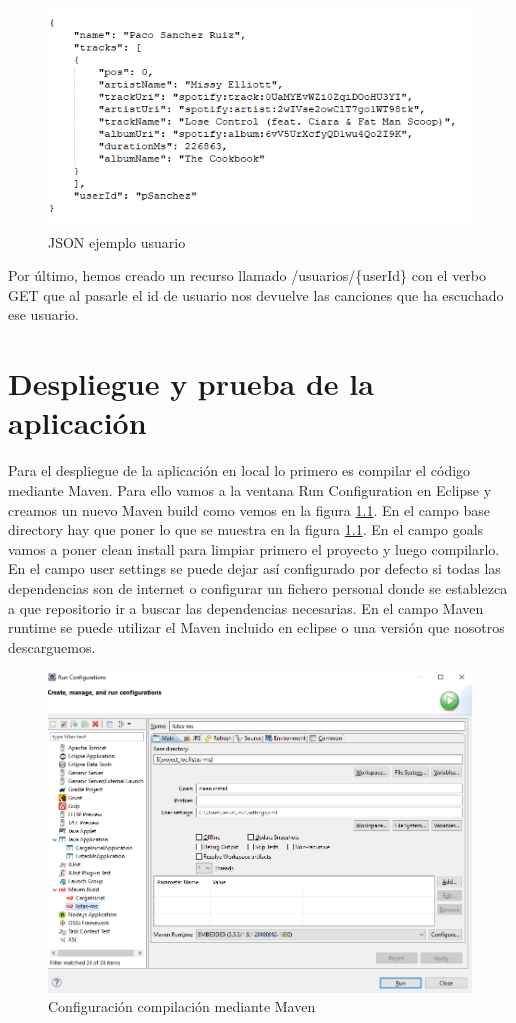 \documentclass[12pt]{report} %
\begin{document}
\begin{figure}
	\centering
	\includegraphics[width=0.7\linewidth]{imagenes/jsonUsuario}
	\caption{JSON ejemplo usuario}
	\label{fig:jsonusuario}
\end{figure}


Por último, hemos creado un recurso llamado /usuarios/\{userId\} con el verbo GET que al pasarle el id de usuario nos devuelve las canciones que ha escuchado ese usuario.

\chapter{Despliegue y prueba de la aplicación }

Para el despliegue de la aplicación en local lo primero es compilar el código mediante Maven. Para ello vamos a la ventana Run Configuration en Eclipse y creamos un nuevo Maven build como vemos en la figura \ref{fig:cleaninstallmaven}. En el campo base directory hay que poner lo que se muestra en la figura \ref{fig:cleaninstallmaven}. En el campo goals vamos a poner clean install para limpiar primero el proyecto y luego compilarlo. En el campo user settings se puede dejar así configurado por defecto si todas las dependencias son de internet o configurar un fichero personal donde se establezca a que repositorio ir a buscar las dependencias necesarias. En el campo Maven runtime se puede utilizar el Maven incluido en eclipse o una versión que nosotros descarguemos.

\begin{figure}
	\centering
	\includegraphics[width=0.7\linewidth]{imagenes/cleanInstallMAven}
	\caption{Configuración compilación mediante Maven}
	\label{fig:cleaninstallmaven}
\end{figure}
\end{document}
